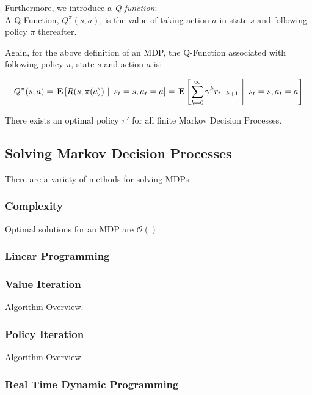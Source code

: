 \documentclass[11pt]{article}
\begin{document}
Furthermore, we introduce a {\it Q-function}: \\

{ A \textup{Q-Function}, $Q^\pi(s,a)$, is the value of taking action $a$ in state $s$ and following policy $\pi$ thereafter}.

Again, for the above definition of an MDP, the Q-Function associated with following policy $\pi$, state $s$ and action $a$ is:

\begin{equation}
Q^\pi(s,a) = \left.\E{R(s,\pi(a))\ \right|\ s_t = s, a_t = a} = \left.\E{\sum_{k=0}^\infty \gamma^k r_{t+k+1}\ \right|\ s_t = s, a_t = a}
\end{equation}

{\lemma There exists an optimal policy $\pi'$ for all finite Markov Decision Processes.}

\subsection{Solving Markov Decision Processes}

There are a variety of methods for solving MDPs.

\subsubsection{Complexity}

{\theorem Optimal solutions for an MDP are $\mathcal{O}()$}

\subsubsection{Linear Programming}

\subsubsection{Value Iteration}

Algorithm Overview.

\subsubsection{Policy Iteration}

Algorithm Overview.

\subsubsection{Real Time Dynamic Programming}
\end{document}
